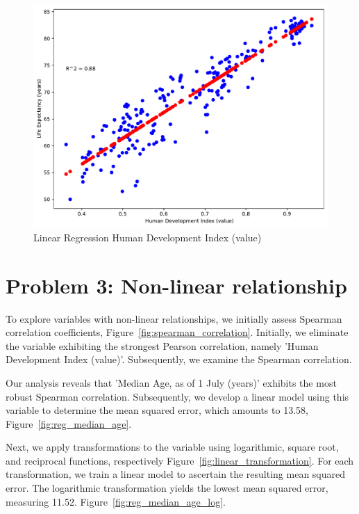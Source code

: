 \documentclass[a4paper]{article}
\begin{document}
\begin{figure}[h]
  \begin{center}
    \includegraphics[width=\textwidth]{ola/_linear_regression_human_development_index_(value).pdf}
    \caption{Linear Regression Human Development Index (value)}
    \label{fig:reg_human_development_index}
  \end{center}
\end{figure}

\section*{Problem 3: Non-linear relationship}

To explore variables with non-linear relationships, we initially assess Spearman correlation coefficients, Figure~\ref{fig:spearman_correlation}. 
Initially, we eliminate the variable exhibiting the strongest Pearson correlation, namely 'Human Development Index (value)'. Subsequently, we examine the Spearman correlation.

Our analysis reveals that 'Median Age, as of 1 July (years)' exhibits the most robust Spearman correlation. Subsequently, 
we develop a linear model using this variable to determine the mean squared error, which amounts to 13.58, Figure~\ref{fig:reg_median_age}.

Next, we apply transformations to the variable using logarithmic, square root, and reciprocal functions, respectively  Figure~\ref{fig:linear_transformation}. 
For each transformation, we train a linear model to ascertain the resulting mean squared error. The logarithmic transformation yields the lowest mean squared error, measuring 11.52.  Figure~\ref{fig:reg_median_age_log}.
\end{document}
